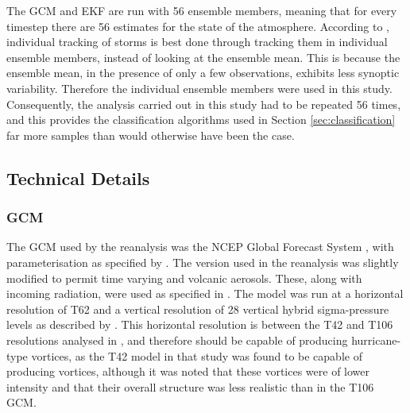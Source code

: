 \documentclass[pdftex,12pt,a4paper]{report}
\begin{document}
The GCM and EKF are run with 56 ensemble members, meaning that for every timestep there are 56
estimates for the state of the atmosphere. According to \textcite{compoTwentieth2011}, individual
tracking of storms is best done through tracking them in individual ensemble members, instead of
looking at the ensemble mean. This is because the ensemble mean, in the presence of only a few
observations, exhibits less synoptic variability. %
Therefore the individual ensemble members were used in this study. Consequently, the analysis
carried out in this study had to be repeated 56 times, and this provides the classification
algorithms used in Section \ref{sec:classification} far more samples than would otherwise have been
the case.

\subsection{Technical Details}

\subsubsection{GCM}
The GCM used by the reanalysis was the NCEP Global Forecast System
\parencite{kanamitsu1989description, kanamitsu1991recent}, with
parameterisation as specified by \textcite{saha2006ncep}. The version used in the reanalysis was
slightly modified to permit time varying  and volcanic aerosols. These, along with incoming
radiation, were used as specified in \textcite{saha2010ncep}. The model was run at a horizontal
resolution of T62 and a vertical resolution of 28 vertical hybrid sigma-pressure levels as described
by \textcite{juang2005discrete}. This horizontal resolution is between the T42 and T106 resolutions
analysed in \textcite{bengtsson1995hurricane}, and therefore should be capable of producing
hurricane-type vortices, as the T42 model in that study was found to be capable of producing
vortices, although it was noted that these vortices were of lower intensity and that their overall
structure was less realistic than in the T106 GCM.
\end{document}
